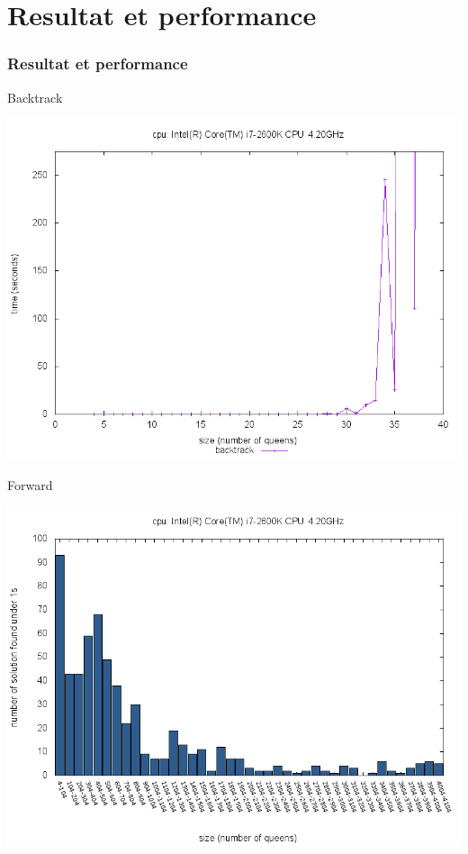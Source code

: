\documentclass[10pt,a4paper]{beamer}
\begin{document}
\section{Resultat et performance}
\begin{frame}
	\frametitle{Resultat et performance}

	\begin{block}{Backtrack}
	
	\includegraphics[width=1\textwidth]{images/plot_bt_i7.png}
	
	\end{block}
	
	\begin{block}{Forward}
	
	\includegraphics[width=1\textwidth]{images/plot_fw_i7.png}
	

\end{block}
\end{frame}
\end{document}
